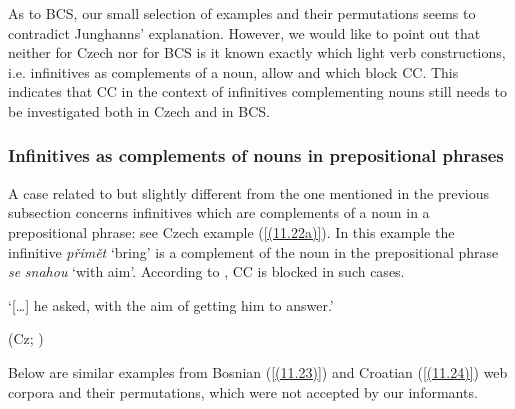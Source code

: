 \noindent As to BCS, our small selection of examples and their permutations seems to contradict Junghanns’ explanation. However, we would like to point out that neither for Czech nor for BCS is it known exactly which light verb constructions, i.e. infinitives as complements of a noun, allow and which block CC. This indicates that CC in the context of infinitives complementing nouns still needs to be investigated both in Czech and in BCS.

\subsubsection{Infinitives as complements of nouns in prepositional phrases}
\label{Infinitives as complements of nouns in prepositional phrases}

A case related to but slightly different from the one mentioned in the previous subsection concerns infinitives which are complements of a noun in a prepositional phrase: see Czech example (\ref{(11.22a)}). In this example the infinitive \textit{přimět} ‘bring’ is a complement of the noun in the prepositional phrase \textit{se} \textit{snahou} ‘with aim’. According to \citet[75]{Junghanns02}, CC is blocked in such cases.


\begin{exe}\ex
\begin{xlist}
\end{xlist}
\glt ‘[\dots] he asked, with the aim of getting him to answer.’ \\
\strut\hfill (Cz; \citealt[75]{Junghanns02})
\end{exe}

\noindent Below are similar examples from Bosnian (\ref{(11.23)}) and Croatian (\ref{(11.24)}) web corpora and their permutations, which were not accepted by our informants. 


